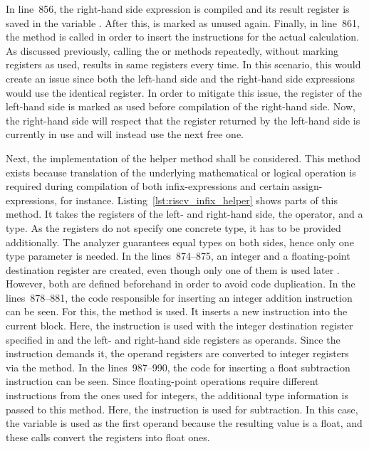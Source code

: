 In line~856, the right-hand side expression is compiled and its result register is saved in the variable .
After this,  is marked as unused again.
Finally, in line~861, the  method is called in order to insert the instructions for the actual calculation.
As discussed previously, calling the  or  methods
repeatedly, without marking registers as used, results in same registers every time.
In this scenario, this would create an issue since both the left-hand side and the right-hand side expressions would use the identical register.
In order to mitigate this issue, the register of the left-hand side is marked as used before compilation of the right-hand side.
Now, the right-hand side will respect that the register returned by the left-hand side is currently in use and will instead use the next free one.

Next, the implementation of the  helper method shall be considered.
This method exists because translation of the underlying mathematical or logical operation
is required during compilation of both infix-expressions and certain assign-expressions,  for instance.
Listing~\ref{lst:riscv_infix_helper} shows parts of this method.%
%
%
It takes the registers of the left- and right-hand side, the operator, and a type.
As the registers do not specify one concrete type, it has to be provided additionally.
The analyzer guarantees equal types on both sides, hence only one type parameter is needed.
In the lines~874--875, an integer and a floating-point destination register are created, even though only one of them is used later .
However, both are defined beforehand in order to avoid code duplication.
In the lines~878--881, the code responsible for inserting an integer addition instruction can be seen.
For this, the  method is used.
It inserts a new instruction into the current block.
Here, the  instruction is used with the integer destination register specified in  and the left- and right-hand side registers as operands.
Since the  instruction demands it, the operand registers are converted to integer registers via the  method.
In the lines~987--990, the code for inserting a float subtraction instruction can be seen.
Since floating-point operations require different instructions from the ones used for integers, the additional type information is passed to this method.
Here, the  instruction is used for subtraction.
In this case, the variable  is used as the first operand because the resulting value is a float,
and these  calls convert the registers into float ones.

